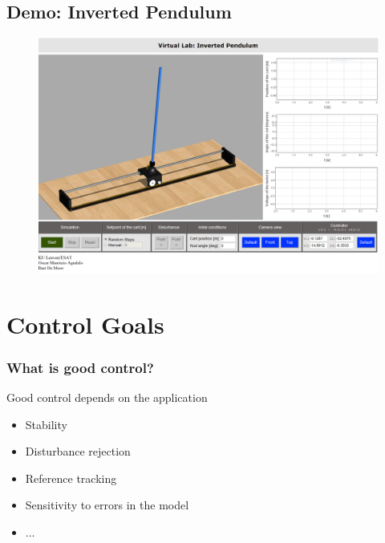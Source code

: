 \subsection[Demo: Inverted Pendulum]{Demo: Inverted Pendulum}
\begin{frame}
	\begin{figure}
\centering
\href{http://homes.esat.kuleuven.be/~magudelo/_html5/test11.html}{\includegraphics[width=1\linewidth]{"inverted-pendulum/full"}}
\label{fig:InvertedPendulum}
\end{figure}
\end{frame}

\section{Control Goals}
\begin{frame}
	\frametitle{What is good control?}
	\begin{block}{Good control depends on the application}
		\begin{itemize}
			\item Stability
			\item Disturbance rejection
			\item Reference tracking
			\item Sensitivity to errors in the model
			\item ...
		\end{itemize}
	\end{block}
\end{frame}

